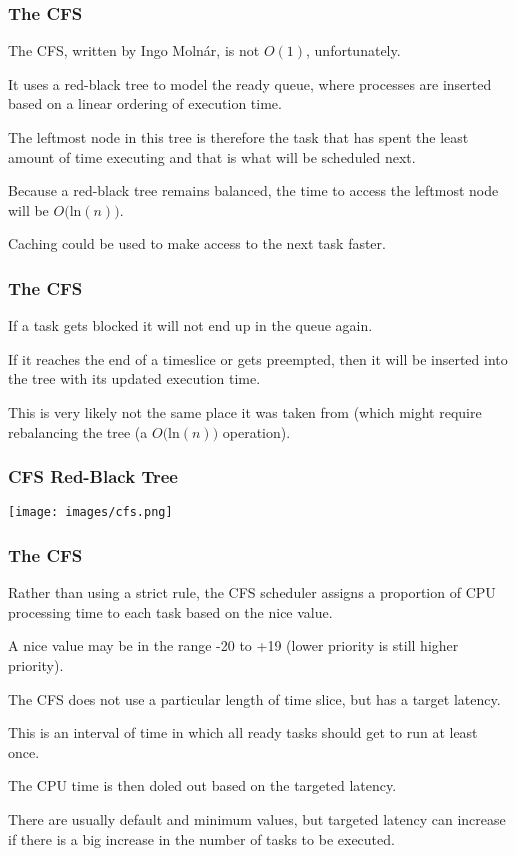 \begin{frame}
\frametitle{The CFS}

The CFS, written by Ingo Moln\'ar, is not $O(1)$, unfortunately. 

It uses a red-black tree to model the ready queue, where processes are inserted based on a linear ordering of execution time. 

The leftmost node in this tree is therefore the task that has spent the least amount of time executing and that is what will be scheduled next. 

Because a red-black tree remains balanced, the time to access the leftmost node will be $O($ln$(n))$.

Caching could be used to make access to the next task faster.


\end{frame}

\begin{frame}
\frametitle{The CFS}

If a task gets blocked it will not end up in the queue again. 

If it reaches the end of a timeslice or gets preempted, then it will be inserted into the tree with its updated execution time.

This is very likely not the same place it was taken from (which might require rebalancing the tree (a $O($ln$(n))$ operation).


\end{frame}

\begin{frame}
\frametitle{CFS Red-Black Tree}

\begin{center}
	\texttt{[image: images/cfs.png]}
\end{center}


\end{frame}

\begin{frame}
\frametitle{The CFS}

Rather than using a strict rule, the CFS scheduler assigns a proportion of CPU processing time to each task based on the nice value. 

A nice value may be in the range -20 to +19 (lower priority is still higher priority).

The CFS does not use a particular length of time slice, but has a \alert{target latency}.

This is an interval of time in which all ready tasks should get to run at least once. 

The CPU time is then doled out based on the targeted latency. 

There are usually default and minimum values, but targeted latency can increase if there is a big increase in the number of tasks to be executed.

\end{frame}

